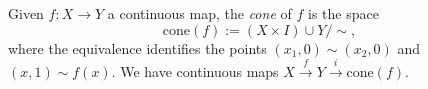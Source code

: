 
 
Given \(f: X\to Y\) a continuous map, the \emph{cone} of \(f\) is the space 
\[\text{cone}(f):= (X\times I)\cup Y / \sim,\]
where the equivalence identifies the points $(x_1, 0)\sim (x_2, 0)$ and $(x, 1)\sim f(x)$.
We have continuous maps  \(X\xrightarrow{f} Y \xrightarrow{i} \text{cone}(f)\).
 